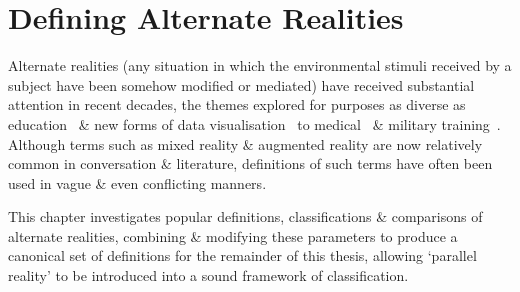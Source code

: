 


\section{Defining Alternate Realities}

Alternate realities (any situation in which the environmental stimuli received by a subject have been somehow modified or mediated) have received substantial attention in recent decades, the themes explored for purposes as diverse as education~\cite{Warburton2009} \& new forms of data visualisation~\cite{Coleman2009} to medical~\cite{TenEyck2011} \& military training~\cite{Qiu2009}. Although terms such as mixed reality \& augmented reality are now relatively common in conversation \& literature, definitions of such terms have often been used in vague \& even conflicting manners.

This chapter investigates popular definitions, classifications \& comparisons of alternate realities, combining \& modifying these parameters to produce a canonical set of definitions for the remainder of this thesis, allowing `parallel reality' to be introduced into a sound framework of classification.

